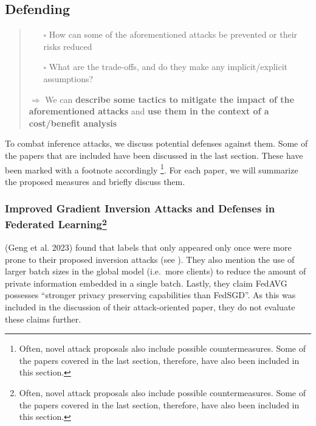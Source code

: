 \hypertarget{defending}{%
\subsection{Defending}\label{defending}}

\begin{quote}
\begin{itemize}
\tightlist
\item[$\square$]
  How can some of the aforementioned attacks be prevented or their risks
  reduced
\item[$\square$]
  What are the trade-offs, and do they make any implicit/explicit
  assumptions?
\end{itemize}

\(\Rightarrow\) We can \textbf{describe some tactics to mitigate the
impact of the aforementioned attacks} and \textbf{use them in the
context of a cost/benefit analysis}
\end{quote}

To combat inference attacks, we discuss potential defenses against them.
Some of the papers that are included have been discussed in the last
section. These have been marked with a footnote accordingly \footnote{Often,
  novel attack proposals also include possible countermeasures. Some of
  the papers covered in the last section, therefore, have also been
  included in this section.}. For each paper, we will summarize the
proposed measures and briefly discuss them.

\hypertarget{improved-gradient-inversion-attacks-and-defenses-in-federated-learning1}{%
\subsubsection[Improved Gradient Inversion Attacks and Defenses in
Federated Learning]{\texorpdfstring{Improved Gradient Inversion Attacks
and Defenses in Federated
Learning\footnote{Often, novel attack proposals also include possible
  countermeasures. Some of the papers covered in the last section,
  therefore, have also been included in this section.}}{Improved Gradient Inversion Attacks and Defenses in Federated Learning}}\label{improved-gradient-inversion-attacks-and-defenses-in-federated-learning1}}

(Geng et al. 2023) found that labels that only appeared only once were
more prone to their proposed inversion attacks (see
\protect\hyperlink{improved-gradient-inversion-attacks-and-defenses-in-federated-learning}{}).
They also mention the use of larger batch sizes in the global model
(i.e.~more clients) to reduce the amount of private information embedded
in a single batch. Lastly, they claim FedAVG possesses ``stronger
privacy preserving capabilities than FedSGD''. As this was included in
the discussion of their attack-oriented paper, they do not evaluate
these claims further.

